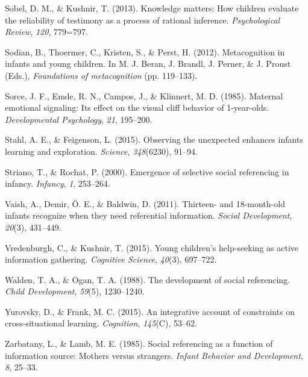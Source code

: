 \documentclass[a4paper,man,apacite,floatsintext]{apa6}
\begin{document}
\hypertarget{ref-Sobel2013}{}
Sobel, D. M., \& Kushnir, T. (2013). Knowledge matters: How children
evaluate the reliability of testimony as a process of rational
inference. \emph{Psychological Review}, \emph{120}, 779=797.

\hypertarget{ref-Sodian2012}{}
Sodian, B., Thoermer, C., Kristen, S., \& Perst, H. (2012).
Metacognition in infants and young children. In M. J. Beran, J. Brandl,
J. Perner, \& J. Proust (Eds.), \emph{Foundations of metacognition} (pp.
119--133).

\hypertarget{ref-Sorce1985}{}
Sorce, J. F., Emde, R. N., Campos, J., \& Klinnert, M. D. (1985).
Maternal emotional signaling: Its effect on the visual cliff behavior of
1-year-olds. \emph{Developmental Psychology}, \emph{21}, 195--200.

\hypertarget{ref-Stahl2015}{}
Stahl, A. E., \& Feigenson, L. (2015). Observing the unexpected enhances
infants learning and exploration. \emph{Science}, \emph{348}(6230),
91--94.

\hypertarget{ref-Striano2000}{}
Striano, T., \& Rochat, P. (2000). Emergence of selective social
referencing in infancy. \emph{Infancy}, \emph{1}, 253--264.

\hypertarget{ref-Vaish2011}{}
Vaish, A., Demir, Ö. E., \& Baldwin, D. (2011). Thirteen- and
18-month-old infants recognize when they need referential information.
\emph{Social Development}, \emph{20}(3), 431--449.

\hypertarget{ref-Vredenburgh2015}{}
Vredenburgh, C., \& Kushnir, T. (2015). Young children's help-seeking as
active information gathering. \emph{Cognitive Science}, \emph{40}(3),
697--722.

\hypertarget{ref-Walden1988}{}
Walden, T. A., \& Ogan, T. A. (1988). The development of social
referencing. \emph{Child Development}, \emph{59}(5), 1230--1240.

\hypertarget{ref-Yurovsky2015}{}
Yurovsky, D., \& Frank, M. C. (2015). An integrative account of
constraints on cross-situational learning. \emph{Cognition},
\emph{145}(C), 53--62.

\hypertarget{ref-Zarbatany1985}{}
Zarbatany, L., \& Lamb, M. E. (1985). Social referencing as a function
of information source: Mothers versus strangers. \emph{Infant Behavior
and Development}, \emph{8}, 25--33.


\end{document}
